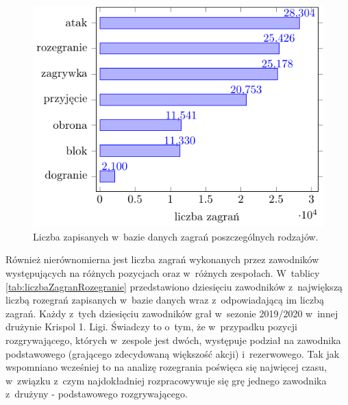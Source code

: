 \documentclass[a4paper,twoside,12pt]{book}
\begin{document}
\begin{figure}
\centering
\includegraphics{zagrania}
\caption{Liczba zapisanych w~bazie danych zagrań poszczególnych rodzajów.}
\label{fig:zagrania}
\end{figure}

Również nierównomierna jest liczba zagrań wykonanych przez zawodników występujących na różnych pozycjach oraz w~różnych zespołach. W~tablicy \ref{tab:liczbaZagranRozegranie} przedstawiono dziesięciu zawodników z~największą liczbą rozegrań zapisanych w~bazie danych wraz z~odpowiadającą im liczbą zagrań. Każdy z~tych dziesięciu zawodników grał w~sezonie 2019/2020 w~innej drużynie Krispol 1. Ligi. Świadczy to o~tym, że w~przypadku pozycji rozgrywającego, których w~zespole jest dwóch, występuje podział na zawodnika podstawowego (grającego zdecydowaną większość akcji) i~rezerwowego. Tak jak wspomniano wcześniej to na analizę rozegrania poświęca się najwięcej czasu, w~związku z~czym najdokładniej rozpracowywuje się grę jednego zawodnika z~drużyny - podstawowego rozgrywającego.
\end{document}

